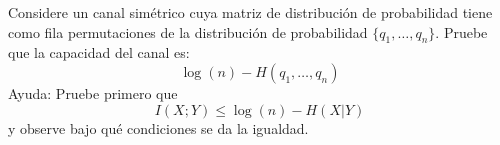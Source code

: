 
Considere un canal simétrico cuya matriz de distribución de probabilidad tiene como fila permutaciones de la distribución de probabilidad $\{q_1, \dots, q_n\}$. Pruebe que la capacidad del canal es:
\begin{equation*}
    \log(n) - H(q_1, \dots, q_n)
\end{equation*}
Ayuda: Pruebe primero que
\begin{equation*}
    I(X;Y) \leq \log(n) - H(X|Y)
\end{equation*}
y observe bajo qué condiciones se da la igualdad.
